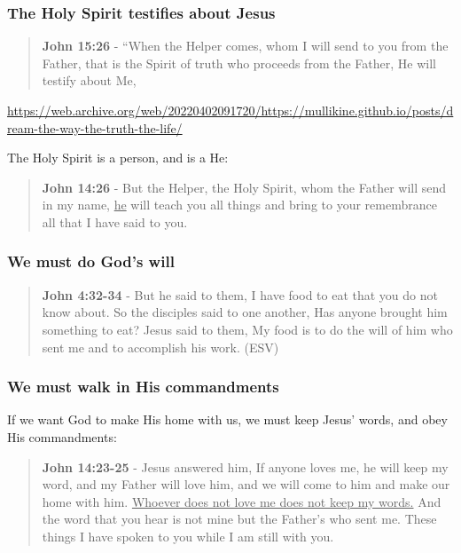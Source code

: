 \documentclass[11pt]{article}
\begin{document}
\subsubsection{The Holy Spirit testifies about Jesus}
\label{sec:org30e7aa2}
\begin{quote}
\textbf{John 15:26} - “When the Helper comes, whom I will send to you from the Father, that is the Spirit of truth who proceeds from the Father, He will testify about Me,
\end{quote}

\url{https://web.archive.org/web/20220402091720/https://mullikine.github.io/posts/dream-the-way-the-truth-the-life/}

The Holy Spirit is a person, and is a He:

\begin{quote}
\textbf{John 14:26} - But the Helper, the Holy Spirit, whom the Father will send in my name, \uline{he} will teach you all things and bring to your remembrance all that I have said to you.
\end{quote}

\subsubsection{We \textbf{must} do God's will}
\label{sec:orgf0e2e9b}

\begin{quote}
\textbf{John 4:32-34} - But he said to them, I have food to eat that you do not know about. So the disciples said to one another, Has anyone brought him something to eat? Jesus said to them, My food is to do the will of him who sent me and to accomplish his work. (ESV)
\end{quote}

\subsubsection{We must walk in His commandments}
\label{sec:org439f61c}
If we want God to make His home with us, we must keep Jesus' words, and obey His commandments:

\begin{quote}
\textbf{John 14:23-25} - Jesus answered him, If anyone loves me, he will keep my word, and my Father will love him, and we will come to him and make our home with him. \uline{Whoever does not love me does not keep my words.} And the word that you hear is not mine but the Father's who sent me. These things I have spoken to you while I am still with you.
\end{quote}
\end{document}
